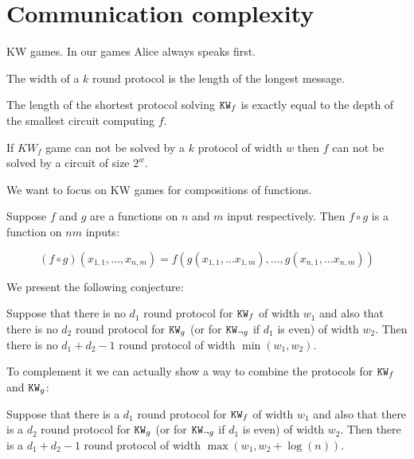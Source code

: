\section{Communication complexity}

\begin{definition}
    KW games. In our games Alice always speaks first.
\end{definition}


\begin{definition}
    The width of a $k$ round protocol is the length of the longest message.
\end{definition}



\begin{theorem}
    The length of the shortest protocol solving $\mathtt{KW}_f$ is exactly equal to the depth of the smallest circuit computing $f$.
\end{theorem}

 

\begin{theorem}
    If $KW_f$ game can not be solved by a $k$ protocol of width $w$ then $f$ can not be solved by a circuit of size $2^w$.
\end{theorem}


We want to focus on KW games for compositions of functions.

\begin{definition}
   Suppose $f$ and $g$ are a functions on $n$ and $m$ input respectively. Then $f \circ g$ is a function
   on $nm$ inputs:
   
   \[(f \circ g)(x_{1, 1}, \dots , x_{n, m}) =
       f(g(x_{1, 1}, \dots x_{1, m}), \dots, g(x_{n, 1}, \dots x_{n, m}) )\]
\end{definition}

We present the following conjecture:

\begin{conjecture}
    Suppose that there is no $d_1$ round protocol for $\mathtt{KW}_f$ of width $w_1$ and also that there is no
    $d_2$ round protocol for $\mathtt{KW}_g$ (or for $\mathtt{KW}_{\neg g}$ if $d_1$ is even) of width $w_2$. Then there is
    no $d_1 + d_2 - 1$ round protocol of width $\min(w_1, w_2)$. 
\end{conjecture}

To complement it we can actually show a way to combine the protocols for $\mathtt{KW}_f$ and $\mathtt{KW}_g$:


\begin{lemma}
    Suppose that there is a $d_1$ round protocol for $\mathtt{KW}_f$ of width $w_1$ and also that there is a
    $d_2$ round protocol for $\mathtt{KW}_g$ (or for $\mathtt{KW}_{\neg g}$ if $d_1$ is even) of width $w_2$. Then there
    is a $d_1 + d_2 - 1$ round protocol of width $\max(w_1, w_2 + \log(n))$. 
\end{lemma}

